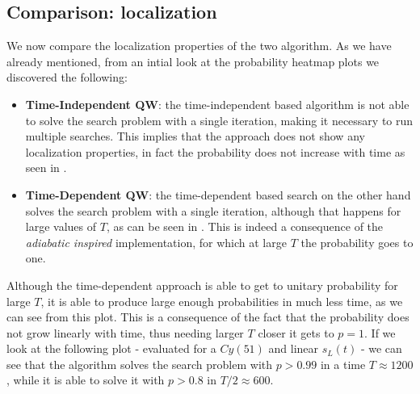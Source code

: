     \clearpage
    \subsection{Comparison: localization}\label{subsec:localization_results}
        We now compare the localization properties of the two algorithm. As we have already mentioned, from an intial look at the probability heatmap plots we discovered the following:
        \begin{itemize}
            \item \textbf{Time-Independent QW}: the time-independent based algorithm is not able to solve the search problem with a single iteration, making it necessary to run multiple searches. This implies that the approach does not show any localization properties, in fact the probability does not increase with time as seen in .
            \item \textbf{Time-Dependent QW}: the time-dependent based search on the other hand solves the search problem with a single iteration, although that happens for large values of $T$, as can be seen in . This is indeed a consequence of the \textit{adiabatic inspired} implementation, for which at large $T$ the probability goes to one.
        \end{itemize}
        

        \clearpage
        \noindent
        Although the time-dependent approach is able to get to unitary probability for large $T$, it is able to produce large enough probabilities in much less time, as we can see from this plot. This is a consequence of the fact that the probability does not grow linearly with time, thus needing larger $T$ closer it gets to $p=1$. If we look at the following plot - evaluated for a $Cy(51)$ and linear $s_L(t)$ - we can see that the algorithm solves the search problem with $p>0.99$ in a time $T\approx 1200$, while it is able to solve it with $p>0.8$ in $T/2 \approx 600$.
        

        \clearpage
